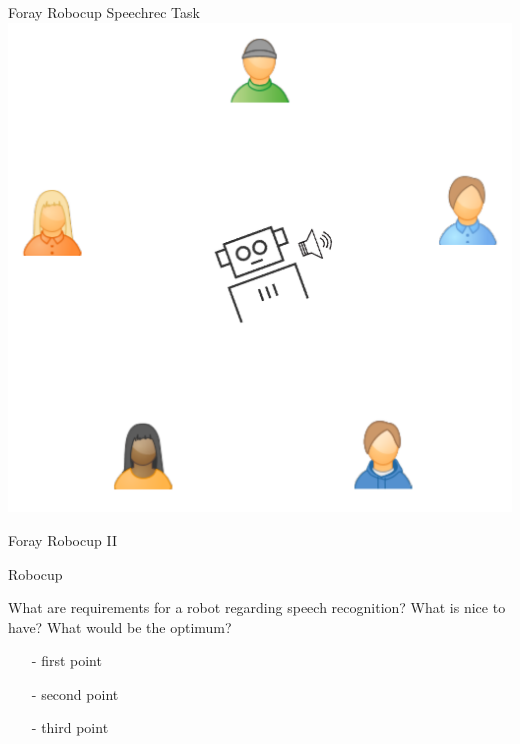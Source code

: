 \documentclass{beamer}
\begin{document}
	\begin{frame}{Foray Robocup Speechrec Task}
		\centering
		\includegraphics[width=.75\textwidth]{Bilder/robocup_task_2}
	\end{frame}
	
	\begin{frame}{Foray Robocup II}
		\centering
	\end{frame}
	
	\begin{frame}{Robocup}
		
		\begin{alertblock}{What are requirements for a robot regarding speech recognition? What is nice to have? What would be the optimum?}
			\pause
			\begin{itemize}
				\item[-] first point
				\item[-] second point
				\item[-] third point
			\end{itemize}
		\end{alertblock}
		
	\end{frame}
	
\end{document}
